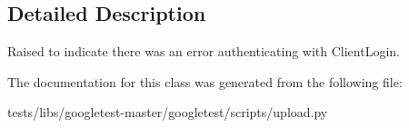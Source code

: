 \subsection{Detailed Description}
\begin{DoxyVerb}Raised to indicate there was an error authenticating with ClientLogin.\end{DoxyVerb}
 

The documentation for this class was generated from the following file\+:\begin{DoxyCompactItemize}
\item 
tests/libs/googletest-\/master/googletest/scripts/upload.\+py\end{DoxyCompactItemize}
